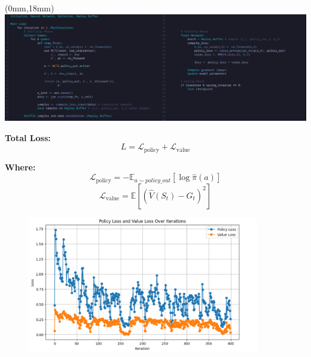 \documentclass[aspectratio=169,xcolor=dvipsnames]{beamer}
\begin{document}
\begin{frame}{}
    \begin{textblock*}{\paperwidth}(0mm,18mm) %
        \includegraphics[width=\paperwidth,height=\paperheight,keepaspectratio]{alphazero_algo.png}
    \end{textblock*}
\end{frame}

\begin{frame}{}
    \textbf{Total Loss:}
    \[
    L = \mathcal{L}_{\text{policy}} + \mathcal{L}_{\text{value}} 
    \]

    \vspace{0.3cm}
    \textbf{Where:}
    \[
        \mathcal{L}_{\text{policy}} = - \mathbb{E}_{a \sim policy\_out} \left[ \log \hat{\pi}(a)  \right]
    \]
    \[
    \mathcal{L}_{\text{value}} = \mathbb{E} \left[ \left( \hat{V}(S_t) - G_t \right)^2  \right]
    \]

\end{frame}

\begin{frame}{}
\begin{figure}[h]
    \centering
    \includegraphics[width=0.9\textwidth]{alphazero_loss_plot1.png}
    \label{fig:intro}
\end{figure}
\end{frame}
\end{document}
